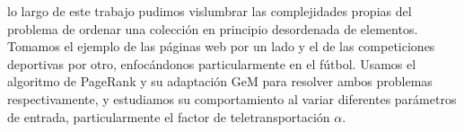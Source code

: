  lo largo de este trabajo pudimos vislumbrar las complejidades propias del problema de ordenar una colección en principio desordenada de elementos. Tomamos el ejemplo de las páginas web por un lado y el de las competiciones deportivas por otro, enfocándonos particularmente en el fútbol. Usamos el algoritmo de PageRank y su adaptación GeM para resolver ambos problemas respectivamente, y estudiamos su comportamiento al variar diferentes parámetros de entrada, particularmente el factor de teletransportación $\alpha$.
